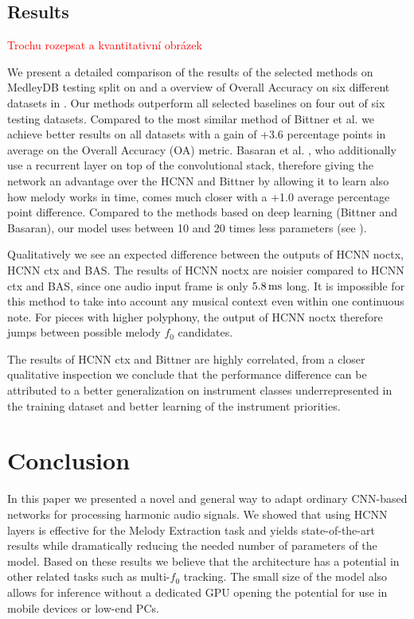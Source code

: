 \documentclass{article}
\begin{document}
\subsection{Results}\label{sec:results}

\textcolor{red}{Trochu rozepsat a kvantitativní obrázek}

We present a detailed comparison of the results of the selected methods on MedleyDB testing split on  and a overview of Overall Accuracy on six different datasets in . Our methods outperform all selected baselines on four out of six testing datasets. Compared to the most similar method of Bittner et al. \cite{Bittner2017} we achieve better results on all datasets with a gain of +3.6 percentage points in average on the Overall Accuracy (OA) metric. Basaran et al. \cite{DBasaranSEssid2018}, who additionally use a recurrent layer on top of the convolutional stack, therefore giving the network an advantage over the HCNN and Bittner by allowing it to learn also how melody works in time, comes much closer with a +1.0 average percentage point difference. Compared to the methods based on deep learning (Bittner and Basaran), our model uses between 10 and 20 times less parameters (see ).

Qualitatively we see an expected difference between the outputs of HCNN noctx, HCNN ctx and BAS. The results of HCNN noctx are noisier compared to HCNN ctx and BAS, since one audio input frame is only $5.8\,\rm ms$ long. It is impossible for this method to take into account any musical context even within one continuous note. For pieces with higher polyphony, the output of HCNN noctx therefore jumps between possible melody $f_0$ candidates.

The results of HCNN ctx and Bittner are highly correlated, from a closer qualitative inspection we conclude that the performance difference can be attributed to a better generalization on instrument classes underrepresented in the training dataset and better learning of the instrument priorities.

\section{Conclusion}

In this paper we presented a novel and general way to adapt ordinary CNN-based networks for processing harmonic audio signals. We showed that using HCNN layers is effective for the Melody Extraction task and yields state-of-the-art results while dramatically reducing the needed number of parameters of the model. Based on these results we believe that the architecture has a potential in other related tasks such as multi-$f_0$ tracking.
The small size of the model also allows for inference without a dedicated GPU opening the potential for use in mobile devices or low-end PCs.
\end{document}
